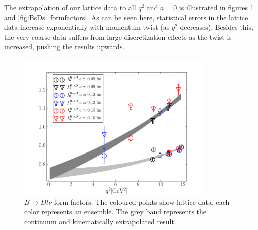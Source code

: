 
The extrapolation of our lattice data to all $q^2$ and $a=0$ is illustrated in figures \ref{fig:BD_formfactors} and \ref{fig:BsDs_formfactors}. As can be seen here, statistical errors in the lattice data increase exponentially with momentum twist (as $q^2$ decreases). Besides this, the very coarse data suffers from large discretization effects as the twist is increased, pushing the results upwards.

\begin{figure}[htb!]
  \begin{center}
    \includegraphics[width=0.85\textwidth]{images/nrqcd/BD_formfactors.pdf}
  \end{center}
  \caption{$B\to Dl\nu$ form factors. The coloured points show lattice data, each color represents an ensemble. The grey band represents the continuum and kinematically extrapolated result. \label{fig:BD_formfactors}}
  \vspace{-20pt}
\end{figure}

